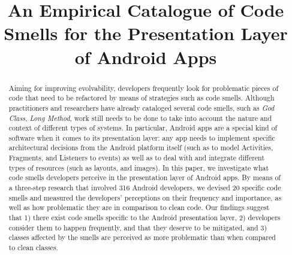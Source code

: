 \documentclass[conference]{IEEEtran}
\begin{document}
\title{An Empirical Catalogue of Code Smells for the Presentation Layer of Android Apps}

\author{
\and
{}
\and
{}
}

\maketitle

\begin{abstract} 

Aiming for improving evolvability, developers frequently look for problematic pieces of code that need to be refactored by means of strategies such as code smells. Although
practitioners and researchers have already cataloged several code smells, such as \textit{God Class}, \textit{Long Method}, work still needs to be done to take into account the nature and context of different types of systems. In particular, Android apps are a special kind of software
when it comes to its presentation layer:
any app needs to implement specific architectural decisions from the Android
platform itself (such as to model Activities, Fragments, and Listeners to events) 
as well as to deal with and integrate different types of resources (such as layouts, and images).
In this paper, we investigate what code smells developers perceive in the presentation
layer of Android apps. By means of a three-step research that involved 316 Android developers,
we devised 20 specific code smells and measured the developers' perceptions on their frequency and importance,
as well as how problematic they are in comparison to clean code.
Our findings suggest that 1) there exist code smells specific to the Android presentation layer, 
2) developers consider them to happen frequently, and that they deserve to be mitigated, and 
3) classes affected by the smells are perceived as more problematic than when compared to clean
classes. 


\end{abstract}
\end{document}
